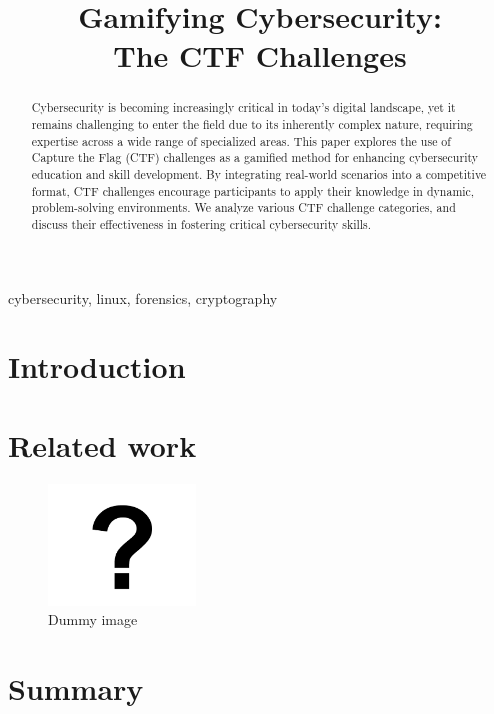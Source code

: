 \documentclass[conference]{IEEEtran}
\begin{document}
\title{Gamifying Cybersecurity:\\The CTF Challenges}

\author{
\and
{}
}

\maketitle

\begin{abstract}
Cybersecurity is becoming increasingly critical in today's digital landscape,
  yet it remains challenging to enter the field due to its inherently complex
  nature, requiring expertise across a wide range of specialized areas. This
  paper explores the use of Capture the Flag (CTF) challenges as a gamified
  method for enhancing cybersecurity education and skill development. By
  integrating real-world scenarios into a competitive format, CTF challenges
  encourage participants to apply their knowledge in dynamic, problem-solving
  environments. We analyze various CTF challenge categories, and discuss their
  effectiveness in fostering critical cybersecurity skills.
\end{abstract}

\begin{IEEEkeywords}
cybersecurity, linux, forensics, cryptography
\end{IEEEkeywords}

\section{Introduction}

\cite{ga-vrp}

\section{Related work}

\begin{figure}[htbp]
	\centering
	\includegraphics[width=0.35\textwidth]{fig/dummy.png}
	\caption{Dummy image}
	\label{fig-dummy}
\end{figure}

\section{Summary}




\end{document}
